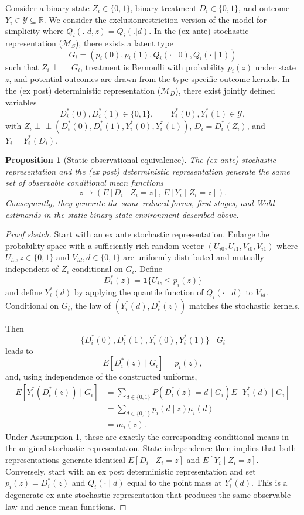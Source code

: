 \documentclass[11pt]{article}
\newtheorem{proposition}{Proposition}
\newcommand{\R}{\mathbb{R}}
\newcommand{\1}{\mathbf{1}}
\newcommand{\cY}{\mathcal{Y}}
\newcommand{\Perp}{\perp \!\!\! \perp}
\begin{document}
Consider a binary state $Z_i\in\{0,1\}$, binary treatment $D_i\in\{0,1\}$, and outcome $Y_i\in\cY\subseteq\R$. We consider the exclusionrestriction version of the model for simplicity where $Q_i(.|d,z) = Q_i(.|d)$. In the (ex ante) stochastic representation ($\mathcal{M}_S$), there exists a latent type
\[
        G_i=(p_i(0),p_i(1),Q_i(\cdot\mid 0),Q_i(\cdot\mid 1))
\]
such that $Z_i\Perp G_i$, treatment is Bernoulli with probability $p_i(z)$ under state $z$, and potential outcomes are drawn from the type-specific outcome kernels. In the (ex post) deterministic representation ($\mathcal{M}_D$), there exist jointly defined variables
\[
        D_i^*(0),D_i^*(1)\in\{0,1\},
        \qquad
        Y_i^*(0),Y_i^*(1)\in\cY,
\]
with $Z_i\Perp(D_i^*(0),D_i^*(1),Y_i^*(0),Y_i^*(1))$, $D_i=D_i^*(Z_i)$, and $Y_i=Y_i^*(D_i)$.

\begin{proposition}[Static observational equivalence]\label{prop:equivalence}The (ex ante) stochastic representation and the (ex post) deterministic representation generate the same set of observable conditional mean functions
\[
z\mapsto
\left(E[D_i\mid Z_i=z],\,E[Y_i\mid Z_i=z]\right).
\]Consequently, they generate the same reduced forms, first stages, and Wald estimands in the static binary-state environment described above.
\end{proposition}

\begin{proof}[Proof sketch]
Start with an ex ante stochastic representation. Enlarge the probability space with a sufficiently rich random vector $(U_{i0},U_{i1},V_{i0},V_{i1})$ where $U_{iz},z\in\{0,1\}$ and $V_{id},d\in\{0,1\}$ are uniformly distributed and mutually independent of $Z_i$ conditional on $G_i$. Define
\[
        D_i^*(z)=\1\{U_{iz}\leq p_i(z)\}
\]
and define $Y_i^*(d)$ by applying the quantile function of $Q_i(\cdot\mid d)$ to $V_{id}$. Conditional on $G_i$, the law of $(Y_i^*(d),D_i^*(z))$ matches the stochastic kernels.


Then
 $$
 \{D_i^*(0),D_i^*(1),Y_i^*(0),Y_i^*(1)\}\mid G_i
$$ leads to \[
E[D_i^*(z)\mid G_i]=p_i(z),
\]and, using independence of the constructed uniforms,
\[
\begin{aligned}
E[Y_i^*(D_i^*(z))\mid G_i]
&=\sum_{d\in\{0,1\}}
P(D_i^*(z)=d\mid G_i)E[Y_i^*(d)\mid G_i]\\
&=\sum_{d\in\{0,1\}}p_i(d\mid z)\mu_i(d)\\
&=m_i(z).
\end{aligned}
\]Under Assumption 1, these are exactly the corresponding conditional means in the original stochastic representation. State independence then implies that both representations generate identical \(E[D_i\mid Z_i=z]\) and \(E[Y_i\mid Z_i=z]\).
Conversely, start with an ex post deterministic representation and set $p_i(z)=D_i^*(z)$ and $Q_i(\cdot\mid d)$ equal to the point mass at $Y_i^*(d)$. This is a degenerate ex ante stochastic representation that produces the same observable law and hence mean functions.
\end{proof}
\end{document}
